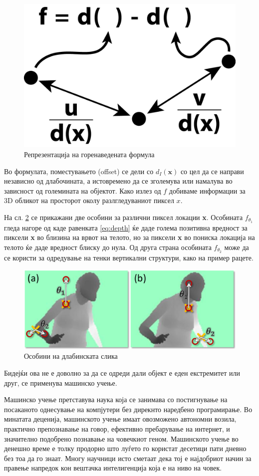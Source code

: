 \documentclass[12pt]{article}
\begin{document}
  \begin{figure}[H]
	  \includegraphics[width=0.35\linewidth]{./images/kinectfeature.png}
		\centering
		\caption{Репрезентација на горенаведената формула}
		\label{fig:kinectfeature.png}
	  \end{figure}

	Во формулата, поместувањето (offset) се дели со $d_I(\textbf{x})$ со цел да се направи независно од длабочината, а истовремено да се зголемува или намалува во зависност од големината на објектот. Како излез од $f$ добиваме информации за 3D обликот на просторот околу разлгледуваниот пиксел $x$.\bigbreak

  На сл. \ref{fig:depth_features.png} се прикажани две особини за различни пиксел локации \textbf{x}. Особината $f_{\theta_1}$ гледа нагоре од каде равенката \ref{eq:depth} ќе даде голема позитивна вредност за пиксели \textbf{x} во близина на врвот на телото, но за пиксели \textbf{x} во пониска локација на телото ќе даде вредност блиску до нула. Од друга страна особината $f_{\theta_2}$ може да се користи за одредување на тенки вертикални структури, како на пример рацете.

  \begin{figure}[H]
    \includegraphics[width=0.75\linewidth]{./images/depth_features.png}
    \centering
    \caption{Особини на длабинската слика}
    \label{fig:depth_features.png}
    \end{figure}

  Бидејќи ова не е доволно за да се одреди дали објект е еден екстремитет или друг, се применува машинско учење.

	Машинско учење претставува наука која се занимава со постигнување на посаканото однесување на компјутери без дирекнто наредбено програмирање. Во минатата деценија, машинското учење имаат овозможено автономни возила, практично препознавање на говор, ефективно пребарување на интернет, и значително подобрено познавање на човечкиот геном. Машинското учење во денешно време е толку продорно што луѓето го користат десетици пати дневно без тоа да го знаат. Многу научници исто сметаат дека тој е најдобриот начин за правење напредок кон вештачка интелигенција која е на ниво на човек.
\end{document}
